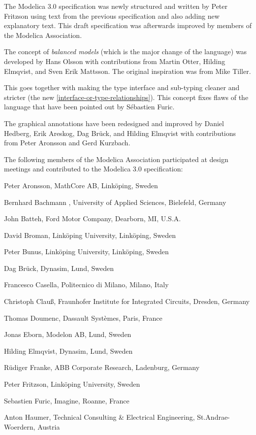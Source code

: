 The Modelica 3.0 specification was newly structured and written by Peter
Fritzson using text from the previous specification and also adding new
explanatory text. This draft specification was afterwards improved by
members of the Modelica Association.

The concept of \emph{balanced models} (which is the major change of the
language) was developed by Hans Olsson with contributions from Martin
Otter, Hilding Elmqvist, and Sven Erik Mattsson. The original
inspiration was from Mike Tiller.

This goes together with making the type interface and sub-typing cleaner
and stricter (the new \cref{interface-or-type-relationships}). This concept fixes flaws of the
language that have been pointed out by Sébastien Furic.

The graphical annotations have been redesigned and improved by Daniel
Hedberg, Erik Areskog, Dag Brück, and Hilding Elmqvist with
contributions from Peter Aronsson and Gerd Kurzbach.

The following members of the Modelica Association participated at design
meetings and contributed to the Modelica 3.0 specification:

Peter Aronsson, MathCore AB, Linköping, Sweden

Bernhard Bachmann , University of Applied Sciences, Bielefeld, Germany

John Batteh, Ford Motor Company, Dearborn, MI, U.S.A.

David Broman, Linköping University, Linköping, Sweden

Peter Bunus, Linköping University, Linköping, Sweden

Dag Brück, Dynasim, Lund, Sweden

Francesco Casella, Politecnico di Milano, Milano, Italy

Christoph Clauß, Fraunhofer Institute for Integrated Circuits, Dresden,
Germany

Thomas Doumenc, Dassault Systèmes, Paris, France

Jonas Eborn, Modelon AB, Lund, Sweden

Hilding Elmqvist, Dynasim, Lund, Sweden

Rüdiger Franke, ABB Corporate Research, Ladenburg, Germany

Peter Fritzson, Linköping University, Sweden

Sebastien Furic, Imagine, Roanne, France

Anton Haumer, Technical Consulting \& Electrical Engineering,
St.Andrae-Woerdern, Austria

